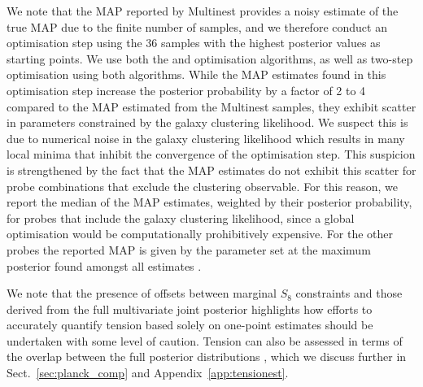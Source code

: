 We note that the MAP reported by {\sc Multinest} provides a noisy estimate of the true MAP due to the finite number of samples, and we therefore conduct an optimisation step using the 36 samples with the highest posterior values as starting points.
We use both the \citet{nelder/mead:1965} and \citet{Powell1964} optimisation algorithms, as well as two-step optimisation using both algorithms.  
While the MAP estimates found in this optimisation step increase the posterior probability by a factor of 2 to 4 compared to the MAP estimated from the {\sc Multinest} samples, they exhibit scatter in parameters constrained by the galaxy clustering likelihood. 
We suspect this is due to numerical noise in the galaxy clustering likelihood which results in many local minima that inhibit the convergence of the optimisation step. 
This suspicion is strengthened by the fact that the MAP estimates do not exhibit this scatter for probe combinations that exclude the clustering observable. 
For this reason, we report the median of the MAP estimates, weighted by their posterior probability, for probes that include the galaxy clustering likelihood, since a global optimisation would be computationally prohibitively expensive. 
For the other probes the reported MAP is given by the parameter set at the maximum posterior found amongst all estimates \citep[see also][who adopt a similar approach]{muir/etal:2020}. 

We note that the presence of offsets between marginal $S_8$ constraints and those derived from the full multivariate joint posterior 
highlights how efforts to accurately quantify tension based solely on one-point estimates should be undertaken with some level of caution.  
Tension can also be assessed in terms of the overlap between the full posterior distributions \citep[see for example][]{handley/lemos:2019,lemos/etal:2019,Raveri2019}, which we discuss further in Sect.~\ref{sec:planck_comp} and Appendix~\ref{app:tensionest}.







